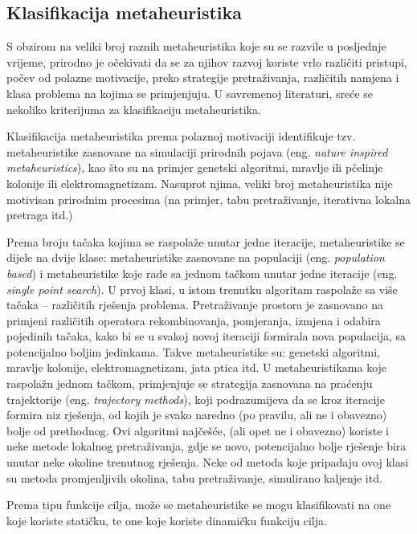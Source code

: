 \documentclass[a4paper, utf8, 11pt, colorlinks]{book}
\theoremstyle{definition}
\begin{document}
 \subsection{Klasifikacija metaheuristika}
 S obzirom na veliki broj raznih metaheuristika koje su se razvile u posljednje vrijeme, prirodno je očekivati da se za  njihov razvoj koriste vrlo različiti pristupi, počev od polazne motivacije, preko strategije pretraživanja, različitih namjena i klasa problema na kojima se primjenjuju.
 U savremenoj literaturi, sreće se nekoliko kriterijuma za klasifikaciju metaheuristika.
 
 Klasifikacija metaheuristika prema polaznoj motivaciji identifikuje tzv. metaheuristike zasnovane na simulaciji prirodnih pojava (eng. \emph{nature inspired metaheuristics}), kao što su na primjer genetski algoritmi, mravlje ili pčelinje kolonije ili elektromagnetizam. Nasuprot njima, veliki broj metaheuristika nije motivisan prirodnim procesima (na primjer, tabu pretraživanje, iterativna lokalna pretraga itd.)
 
 Prema broju tačaka kojima se raspolaže unutar jedne iteracije, metaheuristike se dijele na dvije klase: metaheuristike zasnovane na populaciji (eng. \emph{population based}) i metaheuristike koje rade sa jednom tačkom unutar jedne iteracije (eng. \emph{single point search}). U prvoj klasi, u istom trenutku algoritam raspolaže sa više tačaka -- različitih rješenja problema. Pretraživanje prostora je zasnovano na primjeni različitih operatora rekombinovanja, pomjeranja, izmjena i odabira pojedinih tačaka, kako bi se u svakoj novoj iteraciji formirala nova populacija, sa potencijalno boljim jedinkama. Takve metaheuristike su: genetski algoritmi, mravlje kolonije, elektromagnetizam, jata ptica itd.
 U metaheuristikama koje raspolažu jednom tačkom, primjenjuje se strategija zasnovana na praćenju trajektorije (eng. \emph{trajectory methods}), koji podrazumijeva da se kroz iteracije formira niz rješenja, od kojih je svako naredno (po pravilu, ali ne i obavezno) bolje od prethodnog. Ovi algoritmi najčešće, (ali opet ne i obavezno) koriste i neke metode lokalnog pretraživanja, gdje se novo, potencijalno bolje rješenje bira unutar neke okoline trenutnog rješenja. Neke od metoda koje pripadaju ovoj klasi su metoda promjenljivih okolina, tabu pretraživanje, simulirano kaljenje itd.
 
 Prema tipu funkcije cilja, može se  metaheuristike se mogu klasifikovati na one koje koriste statičku, te one koje koriste dinamičku funkciju cilja.
 
\end{document}
